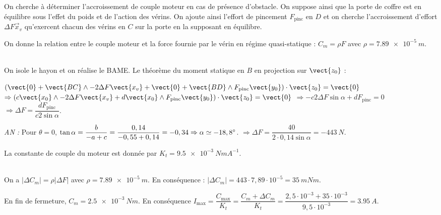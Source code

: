 On cherche à déterminer l’accroissement de couple moteur en cas de présence d’obstacle. On suppose ainsi que la
porte de coffre est en équilibre sous l’effet du poids et de l’action des vérins. On ajoute ainsi l’effort de pincement
$ F_{\text{pinc}}$ en $D$ et on cherche l’accroissement d’effort $\Delta F\vec{x}_v$ qu’exercent chacun des vérins en $C$ sur la porte en la supposant en équilibre.

On donne la relation entre le couple moteur et la force fournie par le vérin en régime quasi-statique : $C_m=\rho F$ avec $\rho=\SI{7,89e-5}{m}$.

\fi


\ifprof
\begin{corrige}~\\
On isole le hayon et on réalise le BAME. Le théorème du moment statique en $B$ en projection sur $\vect{z_0}$ : 

$ \left( 
\vect{0} + \vect{BC}\wedge -2\Delta F \vect{x_v}
+ \vect{0} + \vect{BD}\wedge F_{\text{pinc}}\vect{y_0}
\right) \cdot \vect {z_0} = \vect{0} $
$\Rightarrow \left( 
c\vect{x_0}\wedge -2\Delta F \vect{x_v}
+ d\vect{x_0}\wedge F_{\text{pinc}}\vect{y_0}
\right) \cdot \vect {z_0} = \vect{0}$
$\Rightarrow  
-c 2\Delta F  \sin \alpha + dF_{\text{pinc}}  = {0} $
$\Rightarrow  
\Delta F  = \dfrac{dF_{\text{pinc}}}{c 2  \sin \alpha}  $. 

\textit{AN :}
Pour $\theta=0$, $ \tan \alpha = \dfrac{b}{-a+c}=\dfrac{0,14}{-0,55+0,14}=-0,34 \Rightarrow \alpha \simeq -18,8 ^{\circ}$.
$\Rightarrow  
\Delta F  = \dfrac{40}{2\cdot 0,14  \sin \alpha} = \SI{-443}{N} $.
\end{corrige}
\else

\fi

La constante de couple du moteur est donnée par $K_t = \SI{9,5e-3}{NmA^{-1}}$.

\ifprof
\begin{corrige}~\\
On a $\left|\Delta C_m\right|=\rho \left|\Delta F \right|$ avec $\rho=\SI{7,89e-5}{m}$. En conséquence : $\left|\Delta C_m\right|=443 \cdot 7,89 \cdot 10^{-5} = \SI{35}{mNm}$.

En fin de fermeture, $C_m=\SI{2,5e-3}{Nm}$.
En conséquence $I_{\text{max}}=\dfrac{C_{\text{max}}}{K_t}=\dfrac{C_{m}+\Delta C_m}{K_t}=\dfrac{2,5\cdot 10^{-3}+35\cdot 10^{-3}}{9,5\cdot 10^{-3}}=\SI{3,95}{A}$.

\end{corrige}
\else
\fi

